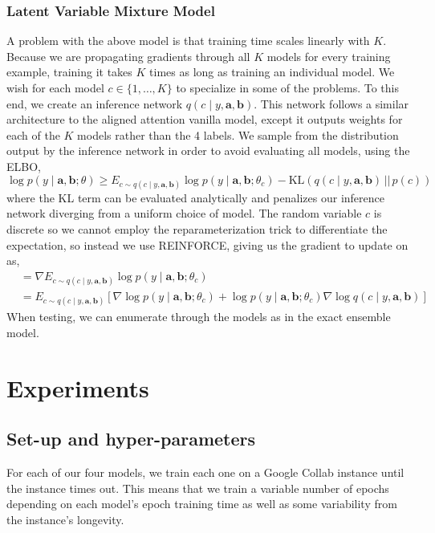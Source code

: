 \documentclass[12pt]{article}
\begin{document}
\subsubsection{Latent Variable Mixture Model} %
\label{subsub:latent_variable_mixture_model}

A problem with the above model is that training time scales linearly with $K$.
Because we are propagating gradients through all $K$ models for every training
example, training it takes $K$ times as long as training an individual model.
We wish for each model $c \in \{1, \ldots, K\}$ to specialize in some of the
problems. To this end, we create an inference network $q(c \mid y, \bm{a},
\bm{b})$. This network follows a similar architecture to the aligned attention
vanilla model, except it outputs weights for each of the $K$ models rather than
the 4 labels. We sample from the distribution output by the inference network in
order to avoid evaluating all models, using the ELBO,
\[ \log p(y \mid \bm{a}, \bm{b}; \theta) \ge E_{c \sim q(c \mid y, \bm{a},
\bm{b})} \log p(y \mid \bm{a}, \bm{b}; \theta_c) - \text{KL}(q(c \mid y, \bm{a},
\bm{b})\, ||\, p(c))\]
where the KL term can be evaluated analytically and penalizes our inference
network diverging from a uniform choice of model. The random variable $c$ is
discrete so we cannot employ the reparameterization trick to differentiate the
expectation, so instead we use REINFORCE, giving us the gradient to update on
as,
\begin{align*}
&= \nabla E_{c \sim q(c \mid y, \bm{a}, \bm{b})} \log p(y \mid \bm{a}, \bm{b};
\theta_c) \\
&= E_{c \sim q(c \mid y, \bm{a}, \bm{b})} \left[ \nabla \log p(y \mid
\bm{a}, \bm{b}; \theta_c) + \log p(y \mid \bm{a}, \bm{b}; \theta_c) \nabla \log
q(c \mid y, \bm{a}, \bm{b})\right]
\end{align*}
When testing, we can enumerate through the models as in the exact ensemble
model.

\section{Experiments}

\subsection{Set-up and hyper-parameters}

For each of our four models, we train each one on a Google Collab instance until
the instance times out. This means that we train a variable number of epochs
depending on each model's epoch training time as well as some variability from
the instance's longevity.
\end{document}

